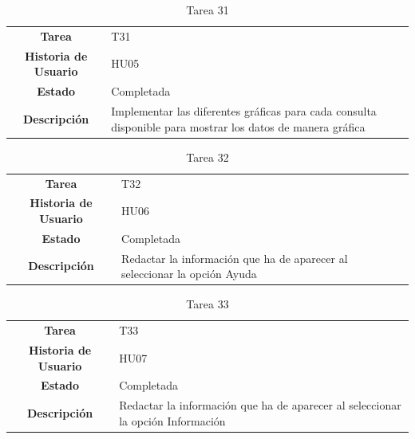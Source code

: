 \begin{table}[H]
	\begin{center}
		\begin{tabular}{| c | p{9cm} |}
			\hline
			
			\textbf{Tarea} & T31 \\
			\textbf{Historia de Usuario} & HU05 \\
			\textbf{Estado} & Completada \\
			\textbf{Descripción} & Implementar las diferentes gráficas para cada consulta disponible para mostrar los datos de manera gráfica \\ \hline
		\end{tabular}
		\caption{Tarea 31}
	\end{center}
\end{table}

\begin{table}[H]
	\begin{center}
		\begin{tabular}{| c | p{9cm} |}
			\hline
			
			\textbf{Tarea} & T32 \\
			\textbf{Historia de Usuario} & HU06 \\
			\textbf{Estado} & Completada \\
			\textbf{Descripción} & Redactar la información que ha de aparecer al seleccionar la opción Ayuda \\ \hline
		\end{tabular}
		\caption{Tarea 32}
	\end{center}
\end{table}

\begin{table}[H]
	\begin{center}
		\begin{tabular}{| c | p{9cm} |}
			\hline
			
			\textbf{Tarea} & T33 \\
			\textbf{Historia de Usuario} & HU07 \\
			\textbf{Estado} & Completada \\
			\textbf{Descripción} & Redactar la información que ha de aparecer al seleccionar la opción Información \\ \hline
		\end{tabular}
		\caption{Tarea 33}
	\end{center}
\end{table}

